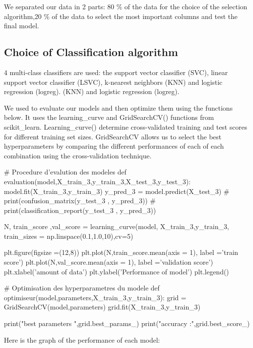 \documentclass[12pt]{article}
\begin{document}
 We separated our data in 2 parts: 80 \% of the data for the choice of the selection algorithm,20 \% of the data to select the most important columns and test the final model.
 
 
\subsection{Choice of Classification algorithm} 

 4 multi-class classifiers are used: the support vector classifier
(SVC), linear support vector classifier
(LSVC), k-nearest neighbors (KNN) and logistic regression (logreg). 
(KNN) and logistic regression (logreg).

\vspace{0.4 cm}
We used to evaluate our models and then optimize them using the functions below.
It uses the learning\_curve and GridSearchCV() functions from scikit\_learn. 
Learning\_curve() determine cross-validated training and test scores for different training set sizes.
GridSearchCV allows us to select the best hyperparameters by comparing the different performances of each of each combination using the cross-validation technique.

\begin{customFrame}
# Procedure d'evalution des modeles
def evaluation(model,X_train_3,y_train_3,X_test_3,y_test_3):
    model.fit(X_train_3,y_train_3)
    y_pred_3 = model.predict(X_test_3)
    # print(confusion_matrix(y_test_3 , y_pred_3))
    # print(classification_report(y_test_3 , y_pred_3))

    N, train_score ,val_score = learning_curve(model, X_train_3,y_train_3,
                            train_sizes = np.linspace(0.1,1.0,10),cv=5)

    plt.figure(figsize =(12,8))
    plt.plot(N,train_score.mean(axis = 1), label ='train score')
    plt.plot(N,val_score.mean(axis = 1), label ='validation score')
    plt.xlabel('amount of data')
    plt.ylabel('Performance of model')
    plt.legend()


# Optimisation des hyperparametres du modele 
def optimiseur(model,parameters,X_train_3,y_train_3):
    grid = GridSearchCV(model,parameters)
    grid.fit(X_train_3,y_train_3)

    print("best parameters ",grid.best_params_)
    print("accuracy :",grid.best_score_)

\end{customFrame}
Here is the graph of the performance of each model: 
\end{document}
